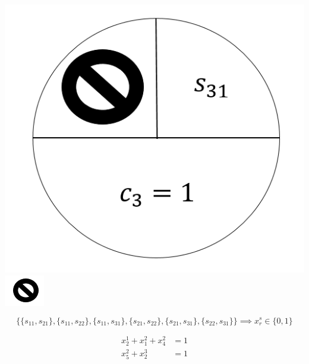 \documentclass[12pt]{article}
\begin{document}
\includegraphics[scale=0.25]{c3}
\includegraphics[scale=1]{symbol}

\begin{equation*}
\{\{s_{11}, s_{21}\}, \{s_{11},s_{22}\},\{s_{11},s_{31}\},  \{s_{21},s_{22}\}, \{s_{21},s_{31}\},  \{s_{22},s_{31}\} \}\implies x_r^s \in \{0, 1\}
\end{equation*}

\begin{align*}
x_2^1+x_1^2+x_4^2&=1\\
x_5^2+x_2^3&=1\\
\end{align*}
\end{document}
